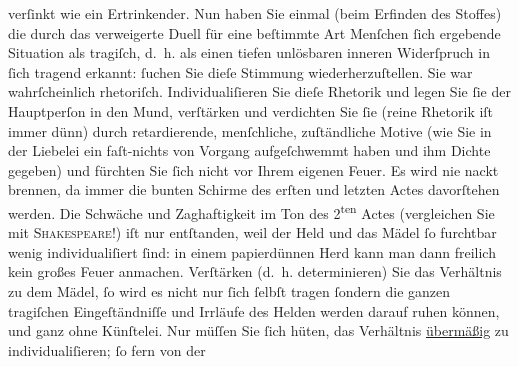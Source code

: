 \begin{ledgroupsized}[t]{13cm}
                    verſinkt wie ein Ertrinkender. Nun haben Sie einmal (beim Erfinden des Stoffes) die durch das verweigerte Duell für
                    eine beſtimmte Art Menſchen ſich ergebende Situation als tragiſch, d. h. als
                    einen tiefen unlösbaren inneren Widerſpruch in ſich tragend erkannt: {\pb}ſuchen Sie dieſe Stimmung
                    wiederherzuſtellen. Sie war wahrſcheinlich rhetoriſch. Individualiſieren Sie
                    dieſe Rhetorik und legen Sie ſie der Hauptperſon in den Mund, verſtärken und
                    verdichten Sie ſie (reine Rhetorik iſt immer dünn) durch retardierende,
                    menſchliche, zuſtändliche Motive (wie Sie in der Liebelei ein faſt-nichts von Vorgang aufgeſchwemmt haben und ihm
                    Dichte gegeben) {\pb}und fürchten
                    Sie ſich nicht vor Ihrem eigenen Feuer. Es wird nie nackt brennen, da immer die
                    bunten Schirme des erſten und letzten Actes davorſtehen werden. Die Schwäche und
                    Zaghaftigkeit im Ton des 2\textsuperscript{ten} Actes (vergleichen Sie mit \textsc{Shakeſpeare}!) iſt nur entſtanden, weil der Held und das Mädel ſo furchtbar wenig
                    individualiſiert ſind: in einem papierdünnen Herd kann man dann freilich kein
                    großes Feuer anmachen. {\pb}Verſtärken \introOben{}(d. h. determinieren)\introOben{}
               Sie das Verhältnis
                    zu dem Mädel, ſo wird es nicht nur ſich ſelbſt tragen ſondern die ganzen
                    tragiſchen Eingeſtändniſſe und Irrläufe des Helden werden darauf ruhen können,
                    und ganz ohne Künſtelei. Nur müſſen Sie ſich hüten, das Verhältnis \uline{übermäßig} zu individualiſieren; ſo fern von der

\end{ledgroupsized}
